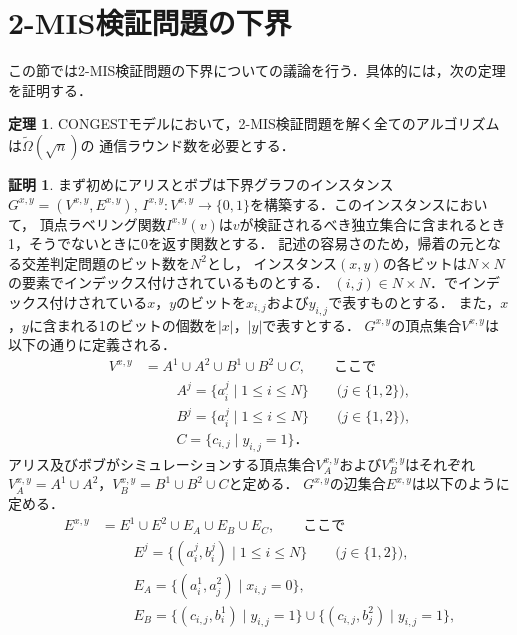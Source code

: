 \documentclass[12pt]{thesis}
\newcommand{\CONGEST}{\textsf{CONGEST}}
\theoremstyle{definition}
\newtheorem{theorem}{定理}[chapter]
\newtheorem*{prf*}{証明}
\begin{document}
\section{2-MIS検証問題の下界}
この節では2-MIS検証問題の下界についての議論を行う．具体的には，次の定理を証明する．
\begin{theorem}
{\CONGEST}モデルにおいて，2-MIS検証問題を解く全てのアルゴリズムは$\tilde{\Omega} (\sqrt{n})$の
通信ラウンド数を必要とする．
\end{theorem}
\begin{prf*}
まず初めにアリスとボブは下界グラフのインスタンス$G^{x,y} = (V^{x,y}, E^{x,y})$, 
$I^{x,y} : V^{x,y} \to \{0, 1\}$を構築する．このインスタンスにおいて，
頂点ラベリング関数$I^{x,y}(v)$は$v$が検証されるべき独立集合に含まれるとき1，そうでないときに0を返す関数とする．
記述の容易さのため，帰着の元となる交差判定問題のビット数を$N^2$とし，
インスタンス$(x, y)$の各ビットは$N\times N$の要素でインデックス付けされているものとする．
$(i, j) \in N \times N$．でインデックス付けされている$x$，$y$のビットを$x_{i,j}$および$y_{i,j}$で表すものとする．
また，$x$，$y$に含まれる1のビットの個数を$|x|$，$|y|$で表すとする．
$G^{x,y}$の頂点集合$V^{x,y}$は以下の通りに定義される．
\begin{align*}
V^{x,y} &= A^{1} \cup A^{2} \cup B^{1} \cup B^{2} \cup C, \quad \quad \text{ここで}\\
&\phantom{=} \quad A^{j} = \{a^{j}_{i} \mid 1\leq i \leq N\} \quad \quad \text{($j \in \{1, 2\}$)}, \\
&\phantom{=} \quad B^{j} = \{a^{j}_{i} \mid 1\leq i \leq N\} \quad \quad \text{($j \in \{1, 2\}$)}, \\
&\phantom{=} \quad C = \{c_{i,j} \mid y_{i,j} = 1\}．
\end{align*}
アリス及びボブがシミュレーションする頂点集合$V^{x,y}_{A}$および$V^{x,y}_{B}$はそれぞれ
$V^{x,y}_{A} = A^{1} \cup A^{2}$，$V^{x,y}_{B} = B^{1} \cup B^{2} \cup C$と定める．
$G^{x,y}$の辺集合$E^{x,y}$は以下のように定める．
\begin{align*}
E^{x,y} &= E^{1} \cup E^{2} \cup E_{A} \cup E_{B} \cup E_{C}, \quad \quad \text{ここで}\\
&\phantom{=} \quad E^{j} = \{(a^{j}_{i}, b^{j}_{i}) \mid 1\leq i \leq N\} \quad \quad \text{($j \in \{1, 2\}$)}, \\
&\phantom{=} \quad E_{A} = \{(a^{1}_{i},a^{2}_{j}) \mid x_{i,j}=0\}, \\
&\phantom{=} \quad E_{B} = \{(c_{i,j},b^{1}_{i}) \mid y_{i,j}=1\} \cup \{(c_{i,j},b^{2}_{j}) \mid y_{i,j}=1\}, \\

\end{align*}
\end{prf*}
\end{document}
